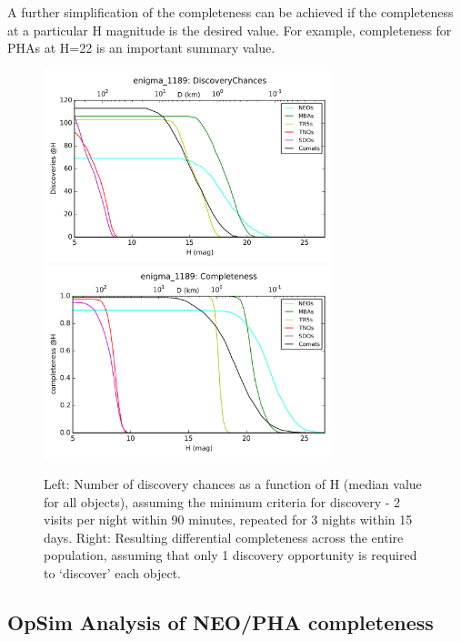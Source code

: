 A further simplification of the completeness can be achieved if the
completeness at a particular H magnitude is the desired value. For
example, completeness for PHAs at H=22 is an important summary value.

\begin{figure}
\includegraphics[width=3.3in]{figs/solarsystem/discoverychances}
\includegraphics[width=3.3in]{figs/solarsystem/completeness}
\caption{Left: Number of discovery chances as a function of H
  (median value for all objects), assuming the minimum criteria for
  discovery - 2 visits per night within 90 minutes, repeated for 3
  nights within 15 days. Right: Resulting differential completeness across the
  entire population, assuming that only 1 discovery opportunity is
  required to `discover' each object.
\label{standard_discovery}}
\end{figure}



\subsection{OpSim Analysis of NEO/PHA completeness}
\label{sec:\secname:analysis}

%

